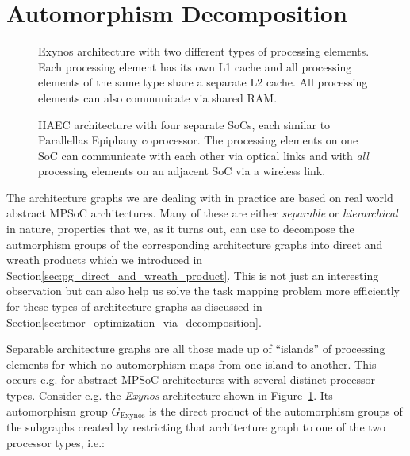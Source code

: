 \section{Automorphism Decomposition}
\label{sec:ag_automorphism_decomposition}

\begin{figure}[!htb]
  \centering
  \caption{Exynos architecture with two different types of processing elements.
           Each processing element has its own L1 cache and all processing
           elements of the same type share a separate L2 cache. All processing
           elements can also communicate via shared RAM.}
  \label{fig:exynos}
\end{figure}

\begin{figure}[!htb]
  \centering
  \caption{HAEC architecture with four separate SoCs, each similar to
           Parallellas Epiphany coprocessor. The processing elements on one
           SoC can communicate with each other via optical links and with
           \textit{all} processing elements on an adjacent SoC via a wireless
           link.}
  \label{fig:haec}
\end{figure}

\noindent
The architecture graphs we are dealing with in practice are based on real world
abstract MPSoC architectures. Many of these are either \textit{separable} or
\textit{hierarchical} in nature, properties that we, as it turns out, can use
to decompose the autmorphism groups of the corresponding architecture graphs
into direct and wreath products which we introduced in
Section\ref{sec:pg_direct_and_wreath_product}. This is not just an
interesting observation but can also help us solve the task mapping problem
more efficiently for these types of architecture graphs as discussed in
Section\ref{sec:tmor_optimization_via_decomposition}.

Separable architecture graphs are all those made up of ``islands'' of
processing elements for which no automorphism maps from one island to another.
This occurs e.g. for abstract MPSoC architectures with several distinct
processor types. Consider e.g. the \textit{Exynos} architecture shown in
Figure~\ref{fig:exynos}. Its automorphism group $G_{\mathrm{Exynos}}$
is the direct product of the automorphism groups of the subgraphs created by
restricting that architecture graph to one of the two processor types, i.e.:

